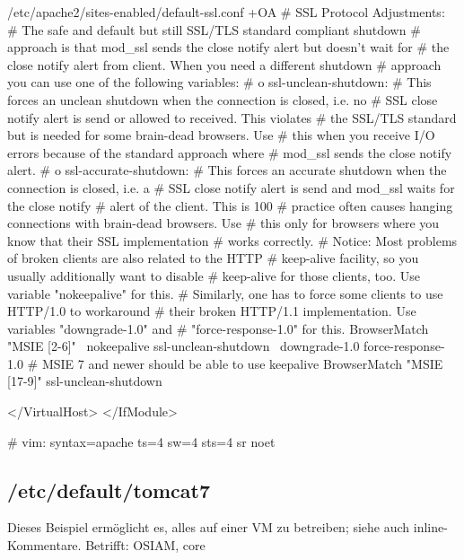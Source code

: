 \begin{lstdump}[tabsize=2]{/etc/apache2/sites-enabled/default-ssl.conf +OA}
		#   SSL Protocol Adjustments:
		#   The safe and default but still SSL/TLS standard compliant shutdown
		#   approach is that mod_ssl sends the close notify alert but doesn't wait for
		#   the close notify alert from client. When you need a different shutdown
		#   approach you can use one of the following variables:
		#   o ssl-unclean-shutdown:
		#	 This forces an unclean shutdown when the connection is closed, i.e. no
		#	 SSL close notify alert is send or allowed to received.  This violates
		#	 the SSL/TLS standard but is needed for some brain-dead browsers. Use
		#	 this when you receive I/O errors because of the standard approach where
		#	 mod_ssl sends the close notify alert.
		#   o ssl-accurate-shutdown:
		#	 This forces an accurate shutdown when the connection is closed, i.e. a
		#	 SSL close notify alert is send and mod_ssl waits for the close notify
		#	 alert of the client. This is 100%
		#	 practice often causes hanging connections with brain-dead browsers. Use
		#	 this only for browsers where you know that their SSL implementation
		#	 works correctly.
		#   Notice: Most problems of broken clients are also related to the HTTP
		#   keep-alive facility, so you usually additionally want to disable
		#   keep-alive for those clients, too. Use variable "nokeepalive" for this.
		#   Similarly, one has to force some clients to use HTTP/1.0 to workaround
		#   their broken HTTP/1.1 implementation. Use variables "downgrade-1.0" and
		#   "force-response-1.0" for this.
		BrowserMatch "MSIE [2-6]" \
				nokeepalive ssl-unclean-shutdown \
				downgrade-1.0 force-response-1.0
		# MSIE 7 and newer should be able to use keepalive
		BrowserMatch "MSIE [17-9]" ssl-unclean-shutdown

	</VirtualHost>
</IfModule>

# vim: syntax=apache ts=4 sw=4 sts=4 sr noet
\end{lstdump}

\subsection{/etc/default/tomcat7}\label{subsec:refcfg-tcdef}

Dieses Beispiel ermöglicht es, alles auf einer VM zu betreiben;
siehe auch inline-Kommentare. Betrifft: OSIAM, core

